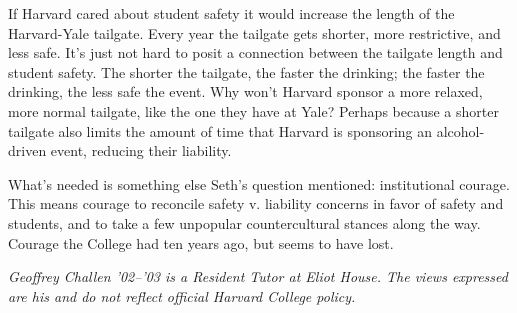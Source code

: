 If Harvard cared about student safety it would increase the length of the
Harvard-Yale tailgate. Every year the tailgate gets shorter, more
restrictive, and less safe. It's just not hard to posit a connection between
the tailgate length and student safety. The shorter the tailgate, the faster
the drinking; the faster the drinking, the less safe the event. Why won't
Harvard sponsor a more relaxed, more normal tailgate, like the one they have
at Yale? Perhaps because a shorter tailgate also limits the amount of time
that Harvard is sponsoring an alcohol-driven event, reducing their liability.

What's needed is something else Seth's question mentioned: institutional
courage. This means courage to reconcile safety v. liability concerns in
favor of safety and students, and to take a few unpopular countercultural
stances along the way. Courage the College had ten years ago, but seems to
have lost.


\textit{Geoffrey Challen '02--'03 is a Resident Tutor at Eliot House. The
views expressed are his and do not reflect official Harvard College policy.}
